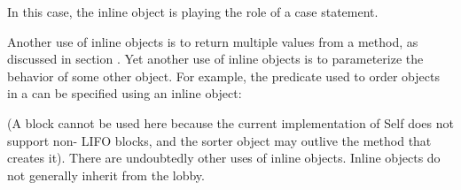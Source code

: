 \documentclass[letterpaper,10pt,english]{sphinxmanual}
\begin{document}
\begin{sphinxVerbatim}[commandchars=\\\{\}]
  
                \PYG{p}{[} \PYG{p}{]}  
                \PYG{p}{[} \PYG{p}{]}
                  
     
\end{sphinxVerbatim}

In this case, the inline object is playing the role of a case statement.

Another use of inline objects is to return multiple values from a method, as discussed in section
{\hyperref[\detokenize{progguid:how-to-return-multiple-values}]{}} {\hyperref[\detokenize{progguid:id2}]{}}. Yet another use of inline objects
is to parameterize the behavior of some other object. For example, the predicate used to order objects
in a  can be specified using an inline object:

\begin{sphinxVerbatim}[commandchars=\\\{\}]
  
             
\end{sphinxVerbatim}

(A block cannot be used here because the current implementation of Self does not support non-
LIFO blocks, and the sorter object may outlive the method that creates it). There are undoubtedly
other uses of inline objects. Inline objects do not generally inherit from the lobby.
\end{document}
